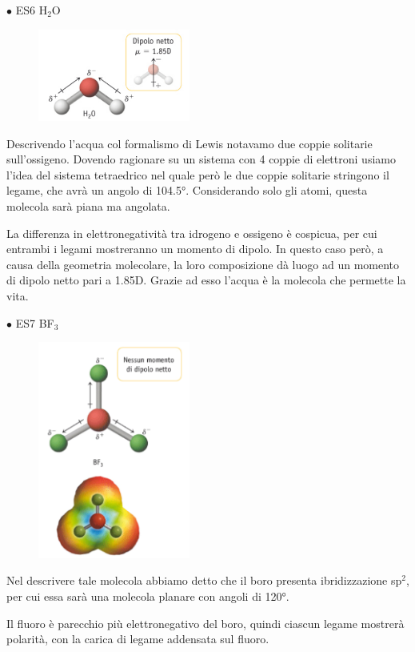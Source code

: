 $\bullet$ ES6 H$_2$O

\begin{figure}[htp]
    \centering
    \includegraphics[width=5cm]{immagini/H_2O.png}
\end{figure}

Descrivendo l'acqua col formalismo di Lewis notavamo due coppie solitarie sull'ossigeno. Dovendo ragionare su un sistema con 4 coppie di elettroni usiamo l'idea del sistema tetraedrico nel quale però le due coppie solitarie stringono il legame, che avrà un angolo di 104.5°. Considerando solo gli atomi, questa molecola sarà piana ma angolata.

La differenza in elettronegatività tra idrogeno e ossigeno è cospicua, per cui entrambi i legami mostreranno un momento di dipolo. In questo caso però, a causa della geometria molecolare, la loro composizione dà luogo ad un momento di dipolo netto pari a 1.85D. Grazie ad esso l'acqua è la molecola che permette la vita.

$\bullet$ ES7 BF$_3$

\begin{figure}[htp]
    \centering
    \includegraphics[width=5cm]{immagini/BF_3-dipolo.png}
\end{figure}

Nel descrivere tale molecola abbiamo detto che il boro presenta ibridizzazione sp$^2$, per cui essa sarà una molecola planare con angoli di 120°.

Il fluoro è parecchio più elettronegativo del boro, quindi ciascun legame mostrerà polarità, con la carica di legame addensata sul fluoro.

